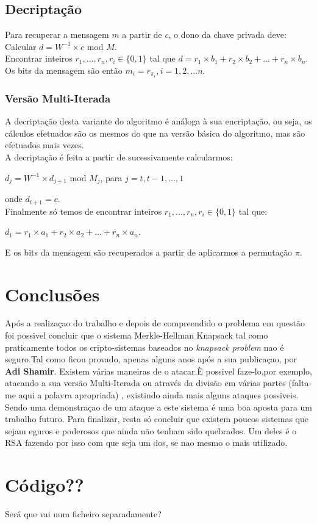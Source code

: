\documentclass[11pt, language=portuguese]{report}
\begin{document}
\section{Decriptação}
Para recuperar a mensagem $m$ a partir de $c$, o dono da chave privada deve:
Calcular $d = W^{-1}\times c$ mod $M$.
\\
Encontrar inteiros ${r_1, ..., r_n}, r_i \in \{0,1\}$ tal que $d = r_1 \times b_1 + r_2 \times b_2 + ... + r_n \times b_n$.
\\
Os bits da mensagem são então $m_i = r_{\pi_i}, i = 1, 2, ... n$.
\subsection{Versão Multi-Iterada}
A decriptação desta variante do algoritmo é análoga à sua encriptação, ou seja, os cálculos efetuados são os mesmos do que na versão básica do algoritmo, mas são efetuados mais vezes.
\\
A decriptação é feita a partir de sucessivamente calcularmos:
\begin{center}
$d_j = W^{-1}\times d_{j+1}$ mod $M_j$, para $j = {t, t-1, ..., 1}$
\end{center}
onde $d_{t+1} = c$.
\\
Finalmente só temos de encontrar inteiros ${r_1, ..., r_n}, r_i \in \{0,1\}$ tal que:
\begin{center}
    $d_1 = r_1\times a_1 + r_2\times a_2 + ... + r_n\times a_n$.
\end{center}
E os bits da mensagem são recuperados a partir de aplicarmos a permutação $\pi$.

\chapter{Conclusões}

Após a realizaçao do trabalho e depois de compreendido o problema em questão foi possivel concluir que o sistema Merkle-Hellman Knapsack tal como praticamente todos os cripto-sistemas baseados no \textit{knapsack problem} nao é seguro.Tal como ficou provado, apenas alguns anos após a sua publicaçao, por \textbf{Adi Shamir}. 
Existem várias maneiras de o atacar.È possivel faze-lo,por exemplo, atacando a sua versão Multi-Iterada ou através da divisão em várias partes (falta-me aqui a palavra apropriada) , existindo ainda mais alguns ataques possiveis. Sendo uma demonstraçao de um ataque a este sistema é uma boa aposta para um trabalho futuro.
Para finalizar, resta só concluir que existem poucos sistemas que sejam eguros e poderosos que ainda não tenham sido quebrados. Um deles é o RSA fazendo por isso com que seja um dos, se nao mesmo o mais utilizado. 

\printbibliography

\appendix

\chapter{Código??}

Será que vai num ficheiro separadamente?
\end{document}

